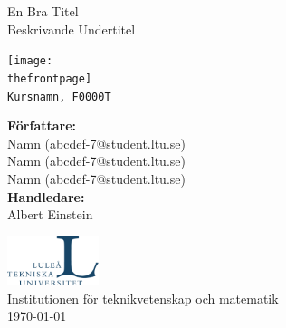 
\def\thetitle{En Bra Titel}
\def\theundertitle{Beskrivande Undertitel}

\def\thefrontpage{framsida.png}

\def\thecourse{Kursnamn, F0000T}

\def\theauthor{
Namn (abcdef-7@student.ltu.se) \\
Namn (abcdef-7@student.ltu.se) \\ 
Namn (abcdef-7@student.ltu.se)
}

\def\thesupervisor{Albert Einstein}

\def\theinstitution{Institutionen för teknikvetenskap och matematik}



\begin{titlepage}
	\centering
	
	{\Huge \textrm{\thetitle} \\}
	{\Large \textrm{\theundertitle} \\}
	\vspace{0.8cm}
	
	\texttt{[image: \\thefrontpage]}\\
	\texttt{\thecourse}\\
	\vspace{0.8cm}
	
	{\textbf{Författare:} \\}
	{\large \theauthor\\} %
	\vspace{0.8cm}
	\textbf{Handledare:}\\
	\large{\thesupervisor}  %
	\vfill
	
    \includegraphics[width=0.2\textwidth]{Images/ltu_swe.jpg} \\
    \vspace{0.2cm}
    \textrm{\theinstitution} \\ \vspace{0.05cm}
	{\large \textrm{\today}\\}
\end{titlepage}